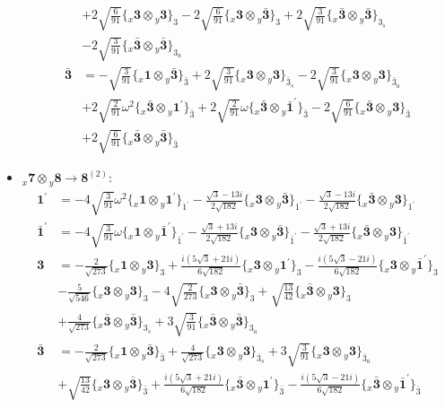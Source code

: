 \documentclass[english]{article}
\newcommand{\rep}[1]{\mathbf{#1}}
\newcommand{\repx}[2]{{}_{#2}\mathbf{#1}}
\newcommand{\tsprodx}[2]{\repx{#1}{x}\otimes\repx{#2}{y}}
\newcommand{\subcgt}[3]{\big\{ \tsprodx{#1}{#2}\big\}^{}_{#3}}
\begin{document}
\begin{itemize}
\begin{align*}
 & +2 \sqrt{\frac{6}{91}}\subcgt{3}{3}{3}-2 \sqrt{\frac{6}{91}}\subcgt{3}{\bar{3}}{3}+2 \sqrt{\frac{3}{91}}\subcgt{\bar{3}}{\bar{3}}{3_{s}} \\ 
 & -2 \sqrt{\frac{3}{91}}\subcgt{\bar{3}}{\bar{3}}{3_{a}}
\\
\rep{\bar{3}} & = -\sqrt{\frac{3}{91}}\subcgt{1}{\bar{3}}{\bar{3}}+2 \sqrt{\frac{3}{91}}\subcgt{3}{3}{\bar{3}_{s}}-2 \sqrt{\frac{3}{91}}\subcgt{3}{3}{\bar{3}_{a}} \\ 
 & +2 \sqrt{\frac{2}{91}} \omega ^2\subcgt{\bar{3}}{1^{\prime}}{\bar{3}}+2 \sqrt{\frac{2}{91}} \omega\subcgt{\bar{3}}{\bar{1}^{\prime}}{\bar{3}}-2 \sqrt{\frac{6}{91}}\subcgt{\bar{3}}{3}{\bar{3}} \\ 
 & +2 \sqrt{\frac{6}{91}}\subcgt{\bar{3}}{\bar{3}}{\bar{3}}
\end{align*}
\item $\tsprodx{7}{8}\to\rep{8}^{(2)}$:
\begin{align*}
\rep{1^{\prime}} & = -4 \sqrt{\frac{3}{91}} \omega ^2\subcgt{1}{1^{\prime}}{1^{\prime}}-\frac{\sqrt{3}-13 i}{2 \sqrt{182}}\subcgt{3}{\bar{3}}{1^{\prime}}-\frac{\sqrt{3}-13 i}{2 \sqrt{182}}\subcgt{\bar{3}}{3}{1^{\prime}}
\\
\rep{\bar{1}^{\prime}} & = -4 \sqrt{\frac{3}{91}} \omega\subcgt{1}{\bar{1}^{\prime}}{\bar{1}^{\prime}}-\frac{\sqrt{3}+13 i}{2 \sqrt{182}}\subcgt{3}{\bar{3}}{\bar{1}^{\prime}}-\frac{\sqrt{3}+13 i}{2 \sqrt{182}}\subcgt{\bar{3}}{3}{\bar{1}^{\prime}}
\\
\rep{3} & = -\frac{2}{\sqrt{273}}\subcgt{1}{3}{3}+\frac{i \left(5 \sqrt{3}+21 i\right)}{6 \sqrt{182}}\subcgt{3}{1^{\prime}}{3}-\frac{i \left(5 \sqrt{3}-21 i\right)}{6 \sqrt{182}}\subcgt{3}{\bar{1}^{\prime}}{3} \\ 
 & -\frac{5}{\sqrt{546}}\subcgt{3}{3}{3}-4 \sqrt{\frac{2}{273}}\subcgt{3}{\bar{3}}{3}+\sqrt{\frac{13}{42}}\subcgt{\bar{3}}{3}{3} \\ 
 & +\frac{4}{\sqrt{273}}\subcgt{\bar{3}}{\bar{3}}{3_{s}}+3 \sqrt{\frac{3}{91}}\subcgt{\bar{3}}{\bar{3}}{3_{a}}
\\
\rep{\bar{3}} & = -\frac{2}{\sqrt{273}}\subcgt{1}{\bar{3}}{\bar{3}}+\frac{4}{\sqrt{273}}\subcgt{3}{3}{\bar{3}_{s}}+3 \sqrt{\frac{3}{91}}\subcgt{3}{3}{\bar{3}_{a}} \\ 
 & +\sqrt{\frac{13}{42}}\subcgt{3}{\bar{3}}{\bar{3}}+\frac{i \left(5 \sqrt{3}+21 i\right)}{6 \sqrt{182}}\subcgt{\bar{3}}{1^{\prime}}{\bar{3}}-\frac{i \left(5 \sqrt{3}-21 i\right)}{6 \sqrt{182}}\subcgt{\bar{3}}{\bar{1}^{\prime}}{\bar{3}} \\ 

\end{align*}
\end{itemize}
\end{document}
